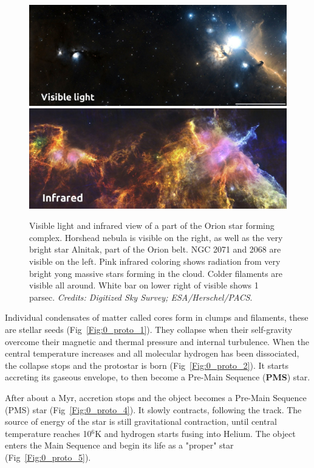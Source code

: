 \begin{figure}
\center
\includegraphics[width=0.95\linewidth]{Figures/0_horsehead_visible2}
\includegraphics[width=0.95\linewidth]{Figures/0_horsehead_infrared}
\caption{Visible light  and infrared view of a part of the Orion star forming complex. Horshead nebula is visible on the right, as well as the very bright star Alnitak, part of the Orion belt. NGC 2071 and 2068 are visible on the left. Pink infrared coloring shows radiation from very bright yong massive stars forming in the cloud. Colder filaments are visible all around. White bar on lower right of visible shows 1 parsec. \textit{Credits: Digitized Sky Survey; ESA/Herschel/PACS}. }
\label{Fig:0_horsehead}
\end{figure}

Individual condensates of matter called cores form in clumps and filaments, these are stellar seeds (Fig~\ref{Fig:0_proto_1}). They collapse when their self-gravity overcome their magnetic and thermal pressure and internal turbulence. When the central temperature increases and all molecular hydrogen has been dissociated, the collapse stops and the protostar is born (Fig~\ref{Fig:0_proto_2}). It starts accreting its gaseous envelope,  to then become a Pre-Main Sequence (\textbf{PMS}) star. 

After about a Myr, accretion stops and the object becomes a Pre-Main Sequence (PMS) star (Fig~\ref{Fig:0_proto_4}). It slowly contracts, following the \cite{Hayashi1961} track. The source of energy of the star is still gravitational contraction, until central temperature reaches 10$^6$K and hydrogen starts fusing into Helium. The  object enters the Main Sequence and begin its life as a "proper" star (Fig~\ref{Fig:0_proto_5}).


